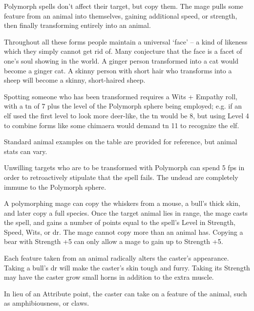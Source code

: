 \begin{multicols}{2}

\noindent
Polymorph spells don't affect their target, but copy them.
The mage pulls some feature from an animal into themselves, gaining additional speed, or strength, then finally transforming entirely into an animal.

Throughout all these forms people maintain a universal `face' -- a kind of likeness which they simply cannot get rid of.
Many conjecture that the face is a facet of one's soul showing in the world.
A ginger person transformed into a cat would become a ginger cat.
A skinny person with short hair who transforms into a sheep will become a skinny, short-haired sheep.

Spotting someone who has been transformed requires a Wits + Empathy roll, with a \gls{tn} of 7 plus the level of the Polymorph sphere being employed;
e.g. if an elf used the first level to look more deer-like, the \gls{tn} would be 8, but using Level 4 to combine forms like some chimaera would demand \gls{tn} 11 to recognize the elf.

Standard animal examples on the table are provided for reference, but animal stats can vary.

Unwilling targets who are to be transformed with Polymorph can spend 5 \glspl{fp} in order to retroactively stipulate that the spell fails.
The undead are completely immune to the Polymorph sphere.

\spelllevel


A polymorphing mage can copy the whiskers from a mouse, a bull's thick skin, and later copy a full species.
Once the target animal lies in range, the mage casts the spell, and gains a number of points equal to the spell's Level in Strength, Speed, Wits, or \gls{dr}.
The mage cannot copy more than an animal has.
Copying a bear with Strength +5 can only allow a mage to gain up to Strength +5.

Each feature taken from an animal radically alters the caster's appearance.
Taking a bull's \gls{dr} will make the caster's skin tough and furry.
Taking its Strength may have the caster grow small horns in addition to the extra muscle.

In lieu of an Attribute point, the caster can take on a feature of the animal, such as amphibiousness, or claws.


\end{multicols}
